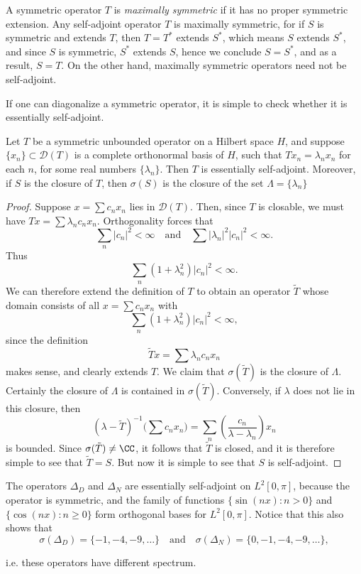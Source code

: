 A symmetric operator $T$ is \emph{maximally symmetric} if it has no proper symmetric extension. Any self-adjoint operator $T$ is maximally symmetric, for if $S$ is symmetric and extends $T$, then $T = T^*$ extends $S^*$, which means $S$ extends $S^*$, and since $S$ is symmetric, $S^*$ extends $S$, hence we conclude $S = S^*$, and as a result, $S = T$. On the other hand, maximally symmetric operators need not be self-adjoint.

If one can diagonalize a symmetric operator, it is simple to check whether it is essentially self-adjoint.

\begin{theorem}
    Let $T$ be a symmetric unbounded operator on a Hilbert space $H$, and suppose $\{ x_n \} \subset \mathcal{D}(T)$ is a complete orthonormal basis of $H$, such that $Tx_n = \lambda_n x_n$ for each $n$, for some real numbers $\{ \lambda_n \}$. Then $T$ is essentially self-adjoint. Moreover, if $S$ is the closure of $T$, then $\sigma(S)$ is the closure of the set $\Lambda = \{ \lambda_n \}$
\end{theorem}
\begin{proof}
    Suppose $x = \sum c_n x_n$ lies in $\mathcal{D}(T)$. Then, since $T$ is closable, we must have $Tx = \sum \lambda_n c_n x_n$. Orthogonality forces that
    \[ \sum_n |c_n|^2 < \infty \quad\text{and}\quad \sum |\lambda_n|^2 |c_n|^2 < \infty. \]
    Thus
    \[ \sum_n (1 + \lambda_n^2) |c_n|^2 < \infty. \]
    We can therefore extend the definition of $T$ to obtain an operator $\tilde{T}$ whose domain consists of all $x = \sum c_n x_n$ with
    \[ \sum_n (1 + \lambda_n^2) |c_n|^2 < \infty, \]
    since the definition
    \[ \tilde{T} x = \sum \lambda_n c_n x_n \]
    makes sense, and clearly extends $T$. We claim that $\sigma(\tilde{T})$ is the closure of $\Lambda$. Certainly the closure of $\Lambda$ is contained in $\sigma(\tilde{T})$. Conversely, if $\lambda$ does not lie in this closure, then
    \[ (\lambda - \tilde{T})^{-1} \Big( \sum c_n x_n \Big) = \sum_n \left( \frac{c_n}{\lambda - \lambda_n} \right) x_n \]
    is bounded. Since $\sigma(\tilde{T}) \neq \CC$, it follows that $\tilde{T}$ is closed, and it is therefore simple to see that $\tilde{T} = S$. But now it is simple to see that $S$ is self-adjoint.
\end{proof}

\begin{example}
    The operators $\Delta_D$ and $\Delta_N$ are essentially self-adjoint on $L^2[0,\pi]$, because the operator is symmetric, and the family of functions $\{ \sin(nx) : n > 0 \}$ and $\{ \cos(nx) : n \geq 0 \}$ form orthogonal bases for $L^2[0,\pi]$. Notice that this also shows that
    \[ \sigma(\Delta_D) = \{ -1, -4, -9, \dots \} \quad\text{and}\quad \sigma(\Delta_N) = \{ 0, -1, -4, -9, \dots \}, \]
    
    i.e. these operators have different spectrum.
\end{example}

